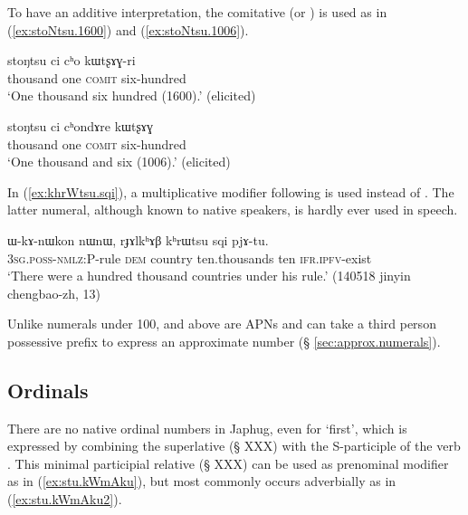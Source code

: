  To have an additive interpretation, the comitative  (or ) is used as in (\ref{ex:stoNtsu.1600}) and (\ref{ex:stoNtsu.1006}).
 
\begin{exe}
\ex  \label{ex:stoNtsu.1600}
\gll  stoŋtsu ci cʰo kɯtʂɤɣ-ri \\
 thousand one \textsc{comit} six-hundred \\
\glt `One thousand six hundred (1600).' (elicited)
\end{exe}
  
\begin{exe}
\ex  \label{ex:stoNtsu.1006}
\gll  stoŋtsu ci cʰondɤre kɯtʂɤɣ \\
 thousand one \textsc{comit} six-hundred \\
\glt `One thousand and six (1006).' (elicited)
\end{exe}

In (\ref{ex:khrWtsu.sqi}), a multiplicative modifier  following  is used instead of . The latter numeral, although known to native speakers, is hardly ever used in speech.

\begin{exe}
\ex  \label{ex:khrWtsu.sqi}
\gll ɯ-kɤ-nɯkon nɯnɯ, rɟɤlkʰɤβ kʰrɯtsu sqi pjɤ-tu. \\
 \textsc{3sg}.\textsc{poss}-\textsc{nmlz}:P-rule \textsc{dem} country ten.thousands ten \textsc{ifr}.\textsc{ipfv}-exist \\
\glt `There were a hundred thousand countries under his rule.' (140518 jinyin chengbao-zh, 13)
\end{exe} 


 
Unlike numerals under 100,  and above are APNs and can take a third person possessive prefix  to express an approximate number (§ \ref{sec:approx.numerals}).

 \subsection{Ordinals} \label{sec:ordinals}
 
 There are no native ordinal numbers in Japhug, even for `first', which is expressed by combining the superlative  (§ XXX) with the S-participle of the verb . This minimal participial relative  (§ XXX) can be used as prenominal modifier as in (\ref{ex:stu.kWmAku}), but most commonly occurs adverbially as in (\ref{ex:stu.kWmAku2}).   
 
